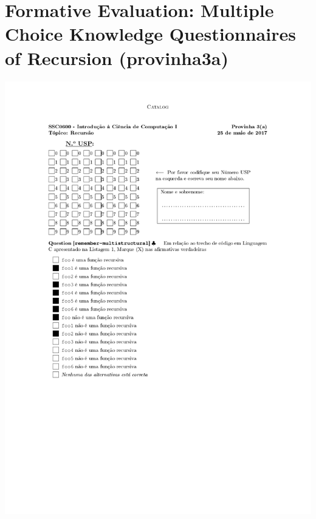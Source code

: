 \section{Formative Evaluation: Multiple Choice Knowledge Questionnaires of Recursion (provinha3a)}
\label{annex:third-study-pre}
\includegraphics[page=1,width=1\textwidth]{images/annex/third-study-pre.pdf}
\newpage
